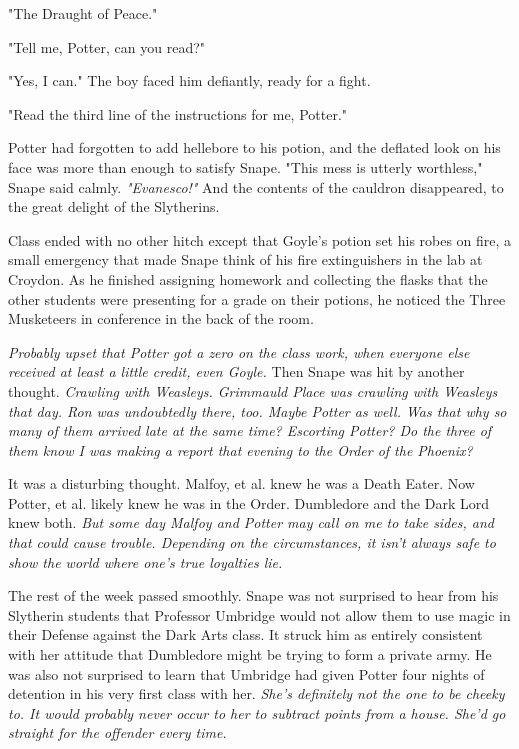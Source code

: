 \documentclass[a4paper,11pt]{article}
\begin{document}
"The Draught of Peace."

"Tell me, Potter, can you read?"

"Yes, I can." The boy faced him defiantly, ready for a fight.

"Read the third line of the instructions for me, Potter."

Potter had forgotten to add hellebore to his potion, and the deflated look on his face was more than enough to satisfy Snape. "This mess is utterly worthless," Snape said calmly. \emph{"Evanesco!"} And the contents of the cauldron disappeared, to the great delight of the Slytherins.

Class ended with no other hitch except that Goyle's potion set his robes on fire, a small emergency that made Snape think of his fire extinguishers in the lab at Croydon. As he finished assigning homework and collecting the flasks that the other students were presenting for a grade on their potions, he noticed the Three Musketeers in conference in the back of the room.

\emph{Probably upset that Potter got a zero on the class work, when everyone else received at least a little credit, even Goyle.} Then Snape was hit by another thought. \emph{Crawling with Weasleys. Grimmauld Place was crawling with Weasleys that day. Ron was undoubtedly there, too. Maybe Potter as well. Was that why so many of them arrived late at the same time? Escorting Potter? Do the three of them know I was making a report that evening to the Order of the Phoenix?}

It was a disturbing thought. Malfoy, et al. knew he was a Death Eater. Now Potter, et al. likely knew he was in the Order. Dumbledore and the Dark Lord knew both. \emph{But some day Malfoy and Potter may call on me to take sides, and that could cause trouble. Depending on the circumstances, it isn't always safe to show the world where one's true loyalties lie.}

The rest of the week passed smoothly. Snape was not surprised to hear from his Slytherin students that Professor Umbridge would not allow them to use magic in their Defense against the Dark Arts class. It struck him as entirely consistent with her attitude that Dumbledore might be trying to form a private army. He was also not surprised to learn that Umbridge had given Potter four nights of detention in his very first class with her. \emph{She's definitely not the one to be cheeky to. It would probably never occur to her to subtract points from a house. She'd go straight for the offender every time.}
\end{document}
